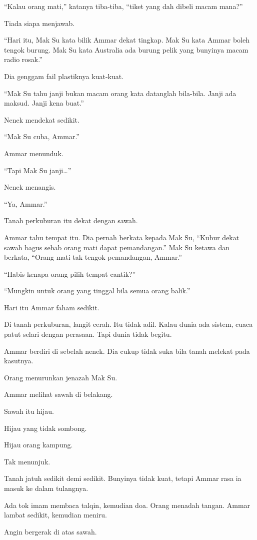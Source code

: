 \documentclass[
  11pt,
  a5paper,
  openany,
  oneside]{book}
\begin{document}
``Kalau orang mati,'' katanya tiba-tiba, ``tiket yang dah dibeli macam
mana?''

Tiada siapa menjawab.

``Hari itu, Mak Su kata bilik Ammar dekat tingkap. Mak Su kata Ammar
boleh tengok burung. Mak Su kata Australia ada burung pelik yang
bunyinya macam radio rosak.''

Dia genggam fail plastiknya kuat-kuat.

``Mak Su tahu janji bukan macam orang kata datanglah bila-bila. Janji
ada maksud. Janji kena buat.''

Nenek mendekat sedikit.

``Mak Su cuba, Ammar.''

Ammar menunduk.

``Tapi Mak Su janji\ldots''

Nenek menangis.

``Ya, Ammar.''

Tanah perkuburan itu dekat dengan sawah.

Ammar tahu tempat itu. Dia pernah berkata kepada Mak Su, ``Kubur dekat
sawah bagus sebab orang mati dapat pemandangan.'' Mak Su ketawa dan
berkata, ``Orang mati tak tengok pemandangan, Ammar.''

``Habis kenapa orang pilih tempat cantik?''

``Mungkin untuk orang yang tinggal bila semua orang balik.''

Hari itu Ammar faham sedikit.

Di tanah perkuburan, langit cerah. Itu tidak adil. Kalau dunia ada
sistem, cuaca patut selari dengan perasaan. Tapi dunia tidak begitu.

Ammar berdiri di sebelah nenek. Dia cukup tidak suka bila tanah melekat
pada kasutnya.

Orang menurunkan jenazah Mak Su.

Ammar melihat sawah di belakang.

Sawah itu hijau.

Hijau yang tidak sombong.

Hijau orang kampung.

Tak menunjuk.

Tanah jatuh sedikit demi sedikit. Bunyinya tidak kuat, tetapi Ammar rasa
ia masuk ke dalam tulangnya.

Ada tok imam membaca talqin, kemudian doa. Orang menadah tangan. Ammar
lambat sedikit, kemudian meniru.

Angin bergerak di atas sawah.
\end{document}
